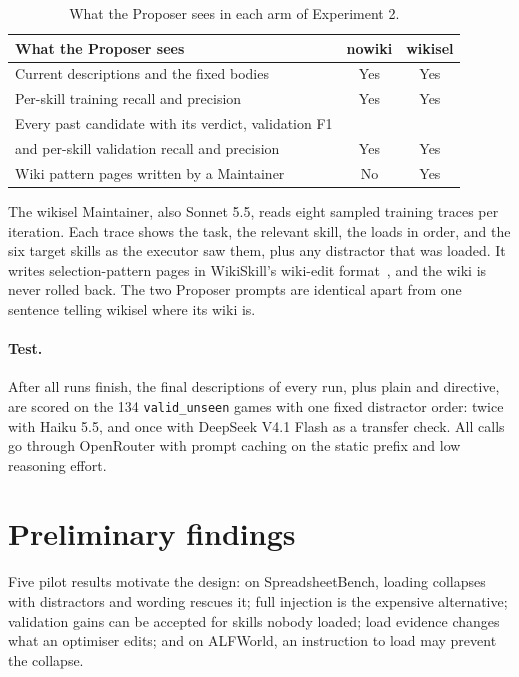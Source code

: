 \documentclass[11pt]{article}
\newcommand{\code}[1]{\texttt{#1}}
\begin{document}
\begin{table}[t]
\centering
\caption{What the Proposer sees in each arm of Experiment 2.}
\label{tab:arms}
\begin{tabular}{lcc}
\toprule
What the Proposer sees & nowiki & wikisel \\
\midrule
Current descriptions and the fixed bodies & Yes & Yes \\
Per-skill training recall and precision & Yes & Yes \\
Every past candidate with its verdict, validation F1 & & \\
\quad and per-skill validation recall and precision & Yes & Yes \\
Wiki pattern pages written by a Maintainer & No & Yes \\
\bottomrule
\end{tabular}
\end{table}

The wikisel Maintainer, also Sonnet 5.5, reads eight sampled training traces per iteration. Each trace shows the task, the relevant skill, the loads in order, and the six target skills as the executor saw them, plus any distractor that was loaded. It writes selection-pattern pages in WikiSkill's wiki-edit format~\cite{tang2026wikiskill}, and the wiki is never rolled back. The two Proposer prompts are identical apart from one sentence telling wikisel where its wiki is.

\paragraph{Test.} After all runs finish, the final descriptions of every run, plus plain and directive, are scored on the 134 \code{valid\_unseen} games with one fixed distractor order: twice with Haiku 5.5, and once with DeepSeek V4.1 Flash as a transfer check. All calls go through OpenRouter with prompt caching on the static prefix and low reasoning effort.

\section{Preliminary findings}
\label{sec:prelim}

Five pilot results motivate the design: on SpreadsheetBench, loading collapses with distractors and wording rescues it; full injection is the expensive alternative; validation gains can be accepted for skills nobody loaded; load evidence changes what an optimiser edits; and on ALFWorld, an instruction to load may prevent the collapse.
\end{document}
